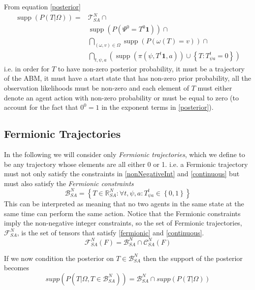 \documentclass{article}
\DeclareMathOperator\supp{supp}
\begin{document}
From equation \ref{posterior}
\begin{equation}
\begin{aligned}
\supp (P( T |\Omega)) = & \mathcal{T}^N_{SA} \cap \\ 
&\supp(P(\Psi^0 = T^0\mathbf{1})) \cap \\
&\bigcap_{(\omega,v) \in \Omega}  \supp\left(P\left(\omega(T)=v\right)\right) \cap \\
&\bigcap_{t, \psi, a} \left( \supp\left(\pi(\psi,T^t\mathbf{1},a)\right) \cup \left\{T:T^t_{\psi a} = 0\right\} \right)
\end{aligned}
\label{support}
\end{equation}
i.e. in order for $T$ to have non-zero posterior probability, it must be a trajectory of the ABM, it must have a start state that has non-zero prior probability, all the observation likelihoods must be non-zero and each element of $T$ must either denote an agent action with non-zero probability or must be equal to zero (to account for the fact that $0^0=1$ in the exponent terms in \ref{posterior}).

\subsection{Fermionic Trajectories}

In the following we will consider only \textit{Fermionic trajectories}, which we define to be any trajectory whose elements are all either 0 or 1. i.e. a Fermionic trajectory must not only satisfy the constraints in \ref{nonNegativeInt} and \ref{continuous} but must also satisfy the \textit{Fermionic constraints}
\begin{equation}
\mathcal{B}^N_{SA} = \left\{T\in\mathbb{R}^N_{SA} : \forall t,\psi,a: T^t_{\psi a} \in \left\{ 0,1 \right\}\right\}
\label{fermionic}
\end{equation}
This can be interpreted as meaning that no two agents in the same state at the same time can perform the same action. Notice that the Fermionic constraints imply the non-negative integer constraints, so the set of Fermionic trajectories, $\mathcal{F}^N_{SA}$, is the set of tensors that satisfy \ref{fermionic} and \ref{continuous}.
\begin{equation}
\mathcal{F}^N_{SA}(F) = \mathcal{B}^N_{SA} \cap \mathcal{C}^N_{SA}(F)
\end{equation}

If we now condition the posterior on $T \in \mathcal{B}^N_{SA}$ then the support of the posterior becomes
\begin{equation}
supp(P(T|\Omega, T\in\mathcal{B}^N_{SA})) = \mathcal{B}^N_{SA} \cap supp(P(T|\Omega))
\label{fermionicSupport1}
\end{equation}
\end{document}
